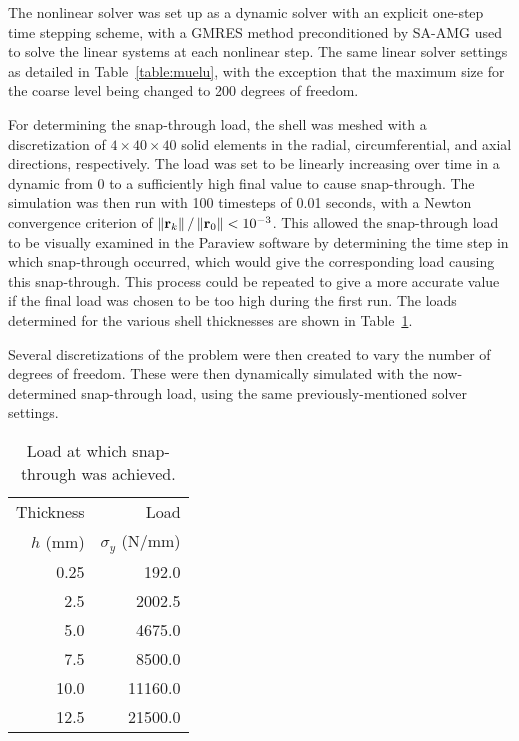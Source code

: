The nonlinear solver was set up as a dynamic solver with an explicit one-step time stepping scheme, with a GMRES method preconditioned by SA-AMG used to solve the linear systems at each nonlinear step. The same linear solver settings as detailed in Table~\ref{table:muelu}, with the exception that the maximum size for the coarse level being changed to 200 degrees of freedom.

For determining the snap-through load, the shell was meshed with a discretization of $4 \times 40 \times 40$ solid elements in the radial, circumferential, and axial directions, respectively. The load was set to be linearly increasing over time in a dynamic from 0 to a sufficiently high final value to cause snap-through. The simulation was then run with 100 timesteps of 0.01 seconds, with a Newton convergence criterion of $\left\lVert\mathbf{r}_k\right\rVert/\left\lVert\mathbf{r}_0\right\rVert < 10^{-3}$. This allowed the snap-through load to be visually examined in the Paraview software by determining the time step in which snap-through occurred, which would give the corresponding load causing this snap-through. This process could be repeated to give a more accurate value if the final load was chosen to be too high during the first run. The loads determined for the various shell thicknesses are shown in Table~\ref{table:shell}.

Several discretizations of the problem were then created to vary the number of degrees of freedom. These were then dynamically simulated with the now-determined snap-through load, using the same previously-mentioned solver settings.

\begin{table}[h]
    \centering
\begin{tabular}{|r|r|}
    \hline
    Thickness & Load  \\
    $h$ (mm) & $\sigma_y$ (N/mm) \\
    \hline
    0.25 & 192.0 \\
    2.5 &  2002.5 \\
    5.0 &  4675.0 \\
    7.5 &  8500.0 \\
    10.0 & 11160.0 \\
    12.5 & 21500.0 \\
    \hline
\end{tabular}
\caption{Load at which snap-through was achieved.}
\label{table:shell}
\end{table}


